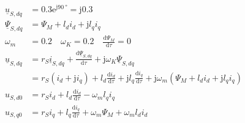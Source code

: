 \documentclass[11pt,a4paper]{scrartcl}
\newcommand{\mybr}[1]{\left(#1\right)}
\renewcommand{\j}{\mathrm{j}}
\renewcommand{\u}{\underline{u}}
\renewcommand{\i}{\underline{i}}
\newcommand{\PPsi}{\underline{\Psi}}
\newcommand{\0}{_{\mybr{0}}}
\newcommand{\1}{_{\mybr{1}}}
\newcommand{\2}{_{\mybr{2}}}
\renewcommand{\e}{\mathrm{e}}
\renewcommand{\d}{\mathrm{d}}
\newcommand{\isdq}{\i_{S,dq}}
\newcommand{\usdq}{\u_{S,dq}}
\newcommand{\psdq}{\PPsi_{S,dq}}
\begin{document}
\section{}
\subsection{}
\begin{align}
\usdq&=\num{0.3}\e^{\j\SI{90}{\degree}}=\j\num{0.3}\\
\psdq&=\Psi_M+l_d i_d+\j l_q i_q\\
\omega_m&=\num{0.2}\quad\omega_K=\num{0.2}\quad\frac{\d\Psi_M}{\d\tau}=0\\
\usdq&=r_S\isdq+\frac{\d\psdq}{\d\tau}+\j\omega_K\psdq\\
&=r_S\mybr{i_d+\j i_q}+l_d\frac{\d i_d}{\d\tau}+\j l_q\frac{\d i_q}{\d\tau}+\j\omega_m \mybr{\Psi_M+l_d i_d+\j l_q i_q}\\
u_{S,d0}&=r_S i_d+l_d\frac{\d i_d}{\d\tau}-\omega_m l_q i_q\\
u_{S,q0}&=r_S i_q+l_q\frac{\d i_q}{\d\tau}+\omega_m \Psi_M +\omega_m l_d i_d
\end{align}
\end{document}

